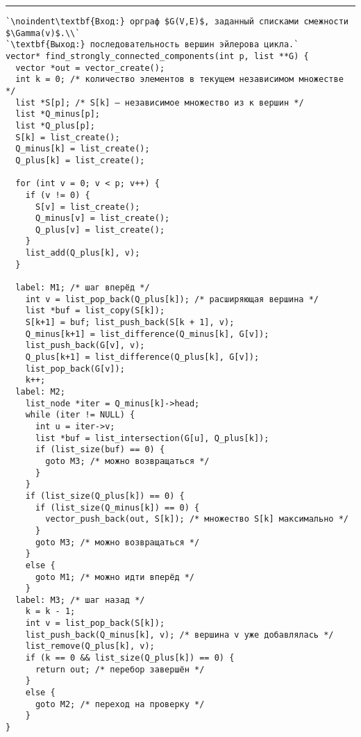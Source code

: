 \documentclass{article}
\begin{document}
\vspace{5pt} \hrule
\begin{lstlisting}[caption={Построение максимальных независимых множеств}, label=p352_max_independent_set_construction, escapechar=`]
`\noindent\textbf{Вход:} орграф $G(V,E)$, заданный списками смежности $\Gamma(v)$.\\`
`\textbf{Выход:} последовательность вершин эйлерова цикла.`
vector* find_strongly_connected_components(int p, list **G) {
  vector *out = vector_create();
  int k = 0; /* количество элементов в текущем независимом множестве */
  list *S[p]; /* S[k] — независимое множество из к вершин */
  list *Q_minus[p];
  list *Q_plus[p];
  S[k] = list_create();
  Q_minus[k] = list_create();
  Q_plus[k] = list_create();

  for (int v = 0; v < p; v++) {
    if (v != 0) {
      S[v] = list_create();
      Q_minus[v] = list_create();
      Q_plus[v] = list_create();
    }
    list_add(Q_plus[k], v);
  }

  label: M1; /* шаг вперёд */
    int v = list_pop_back(Q_plus[k]); /* расширяющая вершина */
    list *buf = list_copy(S[k]);
    S[k+1] = buf; list_push_back(S[k + 1], v);
    Q_minus[k+1] = list_difference(Q_minus[k], G[v]);
    list_push_back(G[v], v);
    Q_plus[k+1] = list_difference(Q_plus[k], G[v]);
    list_pop_back(G[v]);
    k++;
  label: M2;
    list_node *iter = Q_minus[k]->head;
    while (iter != NULL) {
      int u = iter->v;
      list *buf = list_intersection(G[u], Q_plus[k]);
      if (list_size(buf) == 0) {
        goto M3; /* можно возвращаться */
      }
    }
    if (list_size(Q_plus[k]) == 0) {
      if (list_size(Q_minus[k]) == 0) {
        vector_push_back(out, S[k]); /* множество S[k] максимально */
      }
      goto M3; /* можно возвращаться */
    }
    else {
      goto M1; /* можно идти вперёд */
    }
  label: M3; /* шаг назад */
    k = k - 1;
    int v = list_pop_back(S[k]);
    list_push_back(Q_minus[k], v); /* вершина v уже добавлялась */
    list_remove(Q_plus[k], v);
    if (k == 0 && list_size(Q_plus[k]) == 0) {
      return out; /* перебор завершён */
    }
    else {
      goto M2; /* переход на проверку */
    }
}
\end{lstlisting}
\end{document}
